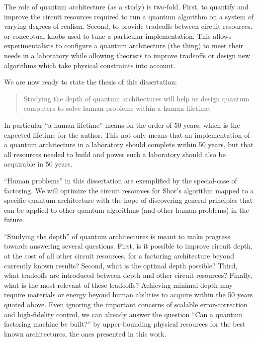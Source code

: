 The role of quantum architecture (as a study) is two-fold. First,
to quantify and improve the circuit resources required to run a quantum
algorithm on a system of varying degrees of realism. Second, to provide
tradeoffs between circuit resources, or conceptual knobs used to tune a
particular implementation. This allows experimentalists to configure a
quantum architecture (the thing) to meet their needs in a laboratory while
allowing theorists to improve tradeoffs or design new algorithms which take
physical constraints into account.

We are now ready to state the thesis of this dissertation:

\begin{quote}
Studying the depth of quantum architectures will help us design quantum
computers to solve
human problems within a human lifetime.
\end{quote}

In particular ``a human lifetime'' means on the order of 50 years, which is
the expected lifetime for the author.
This not only means that an implementation of a quantum architecture
in a laboratory should complete within 50 years, but that all resources
needed to build and power such a laboratory should also be acquirable in
50 years.

``Human problems'' in this dissertation are exemplified by the special-case of
factoring. We will optimize the circuit resources for Shor's algorithm mapped
to a specific quantum architecture with the hope of discovering general
principles that can be applied to other quantum algorithms (and other human
problems) in the future.

``Studying the depth'' of quantum architectures is meant to
make progress towards answering several questions.
First, is it possible to improve circuit depth, at the cost of all
other circuit resources, for a factoring architecture
beyond currently known results?
Second, what is the optimal depth possible?
Third, what tradeoffs are introduced between depth and other circuit
resources? Finally, what is the most relevant of these tradeoffs?
Achieving minimal depth may require materials or energy beyond
human abilities to acquire within the 50 years quoted above. Even ignoring the
important concerns of scalable error-correction and high-fidelity control,
we can already answer the question ``Can a quantum factoring machine be built?''
by upper-bounding physical resources for the best known architectures,
the ones presented in this work.

